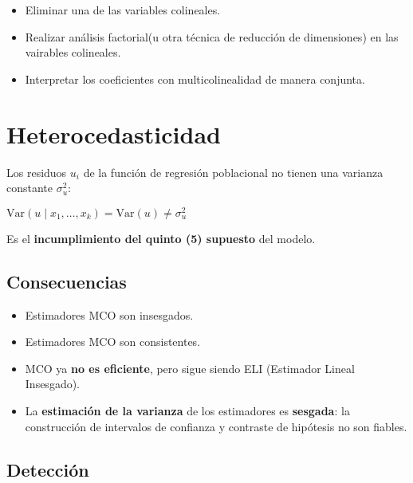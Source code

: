 \documentclass[10pt, a4paper, landscape]{extarticle}
\newcommand{\Var}{\mathrm{Var}}
\begin{document}
\begin{multicols}{3}
\begin{itemize}[leftmargin=*]
			\item Eliminar una de las variables colineales.
			\item Realizar análisis factorial(u otra técnica de reducción de dimensiones) en las vairables colineales.
			\item Interpretar los coeficientes con multicolinealidad de manera conjunta.
\end{itemize}

\columnbreak

\section*{Heterocedasticidad}

Los residuos $u_i$ de la función de regresión poblacional no tienen una varianza constante $\sigma^2_u$:

\begin{center}
	$\Var(u \mid x_1, \ldots, x_k) = \Var(u) \neq \sigma^2_u$
\end{center}

Es el \textbf{incumplimiento del quinto (5) supuesto} del modelo.

\subsection*{Consecuencias}

\begin{itemize}[leftmargin=*]
	\item Estimadores MCO son insesgados.
	\item Estimadores MCO son consistentes.
	\item MCO ya \textbf{no es eficiente}, pero sigue siendo ELI (Estimador Lineal Insesgado).
	\item La \textbf{estimación de la varianza} de los estimadores es \textbf{sesgada}: la construcción de intervalos de confianza y contraste de hipótesis no son fiables.
\end{itemize}

\subsection*{Detección}


\end{multicols}
\end{document}
